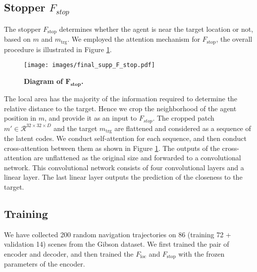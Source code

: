 \documentclass[10pt,twocolumn,letterpaper]{article}
\begin{document}
\subsection{Stopper $F_{stop}$}\label{appendix:impd:F_stop}
%
The stopper $F_\mathrm{stop}$ determines whether the agent is near the target location or not, based on $m$ and $m_\mathrm{trg}$.
%
%
We employed the attention mechanism for $F_\mathrm{stop}$, the overall procedure is illustrated in Figure \ref{fig:sup:F_stop}.
\begin{figure}[t]
  \centering
  \texttt{[image: images/final\_supp\_F\_stop.pdf]}
  \caption{\textbf{Diagram of $\mathbf{F_{stop}}$.}}  
\label{fig:sup:F_stop}
\end{figure}
%
The local area has the majority of the information required to determine the relative distance to the target.
%
Hence we crop the neighborhood of the agent position in $m$, and provide it as an input to $F_{stop}$.
%
The cropped patch $m'\in\mathcal{R}^{32\times32\times D}$ and the target $m_\mathrm{trg}$ are flattened and considered as a sequence of the latent codes.
%
We conduct self-attention for each sequence, and then conduct cross-attention between them as shown in Figure \ref{fig:sup:F_stop}.
%
The outputs of the cross-attention are unflattened as the original size and forwarded to a convolutional network.
%
This convolutional network consists of four convolutional layers and a linear layer.
% 
The last linear layer outputs the prediction of the closeness to the target.
%



\subsection{Training}
We have collected 200 random navigation trajectories on 86 (training 72 + validation 14) scenes from the Gibson \cite{xiazamirhe2018gibsonenv} dataset.
%
We first trained the pair of encoder and decoder, and then trained the $F_\mathrm{loc}$ and $F_\mathrm{stop}$ with the frozen parameters of the encoder.
\end{document}
